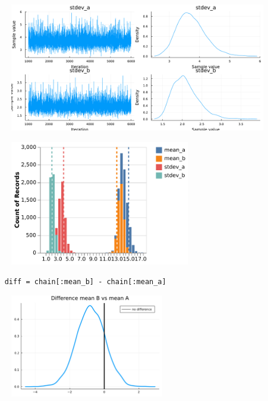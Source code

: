 \documentclass[aspectratio=169,xcolor=svgnames]{beamer}
\begin{document}
\begin{frame}
  \begin{figure}[ht]
    \centering
    \includegraphics[height=0.7\textheight]{figures/chain_stdev.pdf}
  \end{figure}
\end{frame}

\begin{frame}
  \begin{figure}[ht]
    \centering
    \includegraphics[width=0.7\textwidth]{figures/plot_a_b_parameters.pdf}
  \end{figure}
\end{frame}

\begin{frame}[fragile]
  \begin{verbatim}
    diff = chain[:mean_b] - chain[:mean_a]
  \end{verbatim}

  \begin{figure}[ht]
    \centering
    \includegraphics[width=0.6\textwidth]{figures/plot_difference_a_b.pdf}
  \end{figure}
\end{frame}
\end{document}

